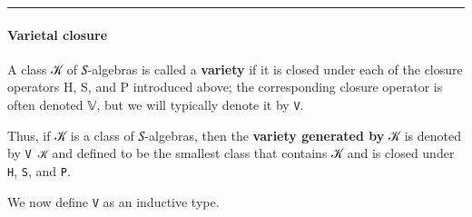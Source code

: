 \begin{center}\rule{0.5\linewidth}{\linethickness}\end{center}

\paragraph{Varietal closure}\label{varietal-closure}

A class 𝒦 of 𝑆-algebras is called a \textbf{variety} if it is closed
under each of the closure operators H, S, and P introduced above; the
corresponding closure operator is often denoted 𝕍, but we will typically
denote it by \texttt{V}.

Thus, if 𝒦 is a class of 𝑆-algebras, then the \textbf{variety generated
by} 𝒦 is denoted by \texttt{V\ 𝒦} and defined to be the smallest class
that contains 𝒦 and is closed under \texttt{H}, \texttt{S}, and
\texttt{P}.

We now define \texttt{V} as an inductive type.

